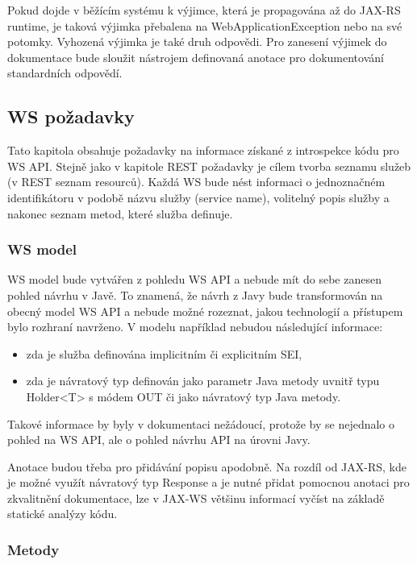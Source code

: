 \documentclass[11pt,twoside,a4paper]{book}
\begin{document}
Pokud dojde v běžícím systému k výjimce, která je propagována až do JAX-RS runtime, je
taková výjimka přebalena na WebApplicationException nebo na své potomky. Vyhozená
výjimka je také druh odpovědi. Pro zanesení výjimek do dokumentace bude sloužit nástrojem
definovaná anotace pro dokumentování standardních odpovědí.

\subsection{WS požadavky}

Tato kapitola obsahuje požadavky na informace získané z introspekce kódu pro WS API.
Stejně jako v kapitole REST požadavky je cílem tvorba seznamu služeb (v REST seznam
resourců). Každá WS bude nést informaci o jednoznačném identifikátoru v podobě názvu
služby (service name), volitelný popis služby a nakonec seznam metod, které služba definuje.

\subsubsection{WS model}

WS model bude vytvářen z pohledu WS API a nebude mít do sebe zanesen pohled návrhu v
Javě. To znamená, že návrh z Javy bude transformován na obecný model WS API a nebude
možné rozeznat, jakou technologií a přístupem bylo rozhraní navrženo. V modelu například
nebudou následující informace:

\begin{itemize}
  \item zda je služba definována implicitním či explicitním SEI,
  \item zda je návratový typ definován jako parametr Java metody uvnitř typu Holder<T> s
módem OUT či jako návratový typ Java metody.
\end{itemize}

Takové informace by byly v dokumentaci nežádoucí, protože by se nejednalo o pohled na WS
API, ale o pohled návrhu API na úrovni Javy.

Anotace budou třeba pro přidávání popisu apodobně. Na rozdíl od JAX-RS, kde je možné
využít návratový typ Response a je nutné přidat pomocnou anotaci pro zkvalitnění
dokumentace, lze v JAX-WS většinu informací vyčíst na základě statické analýzy kódu.

\subsubsection{Metody}
\end{document}
